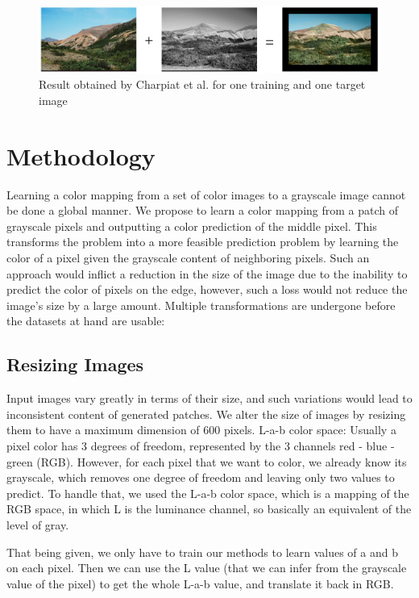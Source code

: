 \documentclass[10pt,twocolumn]{article}
\begin{document}
\begin{figure}[h]
\centering 
 \includegraphics[width=7.7 cm]{charpiatResult.png} 
\caption{\scriptsize Result obtained by Charpiat et al. for one training and one target image}
\label{fig:charpiat}
\end{figure} 


\section{Methodology}
Learning a color mapping from a set of color images to a grayscale image cannot be done a global manner. We propose to learn a color mapping from a patch of grayscale pixels and outputting a color prediction of the middle pixel. This transforms the problem into a more feasible prediction problem by learning the color of a pixel given the grayscale content of neighboring pixels. Such an approach would inflict a reduction in the size of the image due to the inability to predict the color of pixels on the edge, however, such a loss would not reduce the image's size by a large amount.
Multiple transformations are undergone before the datasets at hand are usable:

\subsection{Resizing Images}
Input images vary greatly in terms of their size, and such variations would lead to inconsistent content of generated patches. We alter the size of images by resizing them to have a maximum dimension of 600 pixels.
L-a-b color space:
Usually a pixel color has 3 degrees of freedom, represented by the 3 channels red - blue - green (RGB). However, for each pixel that we want to color, we already know its grayscale, which removes one degree of freedom and leaving only two values to predict. To handle that, we used the L-a-b color space, which is a mapping of the RGB space, in which L is the luminance channel, so basically an equivalent of the level of gray. 

That being given, we only have to train our methods to learn values of a and b on each pixel. Then we can use the L value (that we can infer from the grayscale value of the pixel) to get the whole L-a-b value, and translate it back in RGB. 
\end{document}
